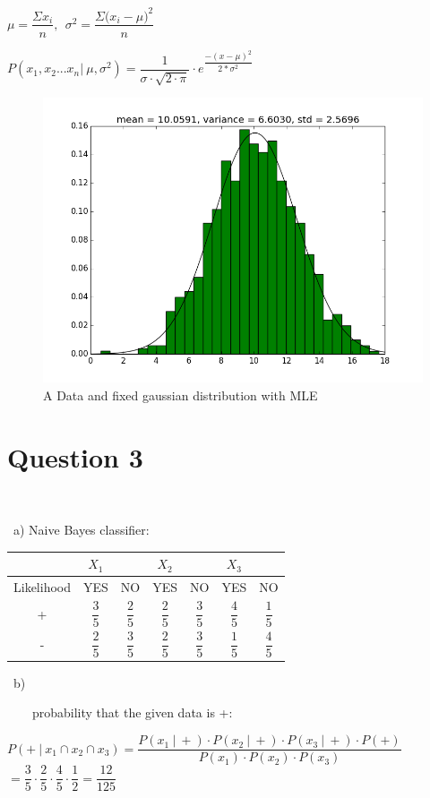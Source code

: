 \documentclass{article}
\begin{document}
$\mu = \dfrac{\Sigma{x_i}}{n},\ \ \sigma^2 = \dfrac{\Sigma{(x_i-\mu})^2}{n}$

$P(x_1, x_2 ... x_n |\ \mu, \sigma^2 ) = \dfrac{1}{\sigma \cdot \sqrt{2\cdot\pi}} \cdot e^{\dfrac{-(x-\mu)^2}{2*\sigma^2}}$


\begin{figure}
  \centering
  \includegraphics[width=0.8\linewidth]{figure_1.png}
  \caption{A Data and fixed gaussian distribution with MLE}
  \label{fig:figure1}
\end{figure}

\newpage
\section{Question 3} 

\ a) Naive Bayes classifier:
\begin{center}
    \begin{tabular}{ | c | c  c | c c | c c |}
    \hline
     & $X_1$ & & $X_2$ & & $X_3$ & \\ \hline
    Likelihood & YES & NO & YES & NO & YES & NO \\ \hline
    + & $\dfrac{3}{5}$ & $\dfrac{2}{5}$ & $\dfrac{2}{5}$ & $\dfrac{3}{5}$ & $\dfrac{4}{5}$ & $\dfrac{1}{5}$ \\[20pt] \hline
    - & $\dfrac{2}{5}$ & $\dfrac{3}{5}$ & $\dfrac{2}{5}$ & $\dfrac{3}{5}$ & $\dfrac{1}{5}$ & $\dfrac{4}{5}$ \\[20pt] \hline
    \end{tabular}
\end{center}

\ b) 

\ \ \ \ probability that the given data is +: \\


{\centering

  $P(+\ | \ x_1 \cap x_2 \cap x_3) = \dfrac{P(x_1\ | \ +) \cdot P(x_2\ | \ +) \cdot P(x_3\ | \ +) \cdot P(+)}{P(x_1) \cdot P(x_2) \cdot P(x_3)}$ \\ 

  $ = \dfrac{3}{5} \cdot \dfrac{2}{5} \cdot \dfrac{4}{5} \cdot \dfrac{1}{2} = \dfrac{12}{125} $\par
}
\end{document}
